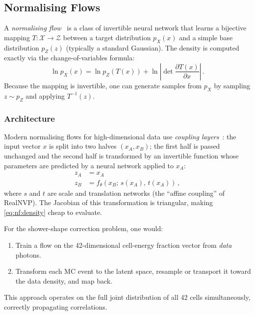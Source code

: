\documentclass[11pt,a4paper]{article}
\begin{document}
\subsection{Normalising Flows}
\label{sec:alternatives:nf}

A \emph{normalising flow}~\cite{Papamakarios:2021,NSF:2019,MAF:2017}
is a class of invertible neural network that learns a bijective
mapping $T: \mathcal{X} \to \mathcal{Z}$ between a target
distribution $p_X(x)$ and a simple base distribution
$p_Z(z)$ (typically a standard Gaussian).  The density is
computed exactly via the change-of-variables formula:
\begin{equation}
  \ln p_X(x) = \ln p_Z(T(x)) + \ln\left|
    \det \frac{\partial T(x)}{\partial x}\right|\,.
  \label{eq:nf:density}
\end{equation}
Because the mapping is invertible, one can generate samples from
$p_X$ by sampling $z \sim p_Z$ and applying $T^{-1}(z)$.

\subsubsection{Architecture}

Modern normalising flows for high-dimensional data use
\emph{coupling layers}~\cite{RealNVP:2017}: the input vector $x$ is
split into two halves $(x_A, x_B)$; the first half is passed
unchanged and the second half is transformed by an invertible
function whose parameters are predicted by a neural network
applied to $x_A$:
\begin{align}
  z_A &= x_A \\
  z_B &= f_\theta(x_B;\, s(x_A),\, t(x_A))\,,
  \label{eq:nf:coupling}
\end{align}
where $s$ and $t$ are scale and translation networks (the ``affine
coupling'' of RealNVP).  The Jacobian of this transformation is
triangular, making \cref{eq:nf:density} cheap to evaluate.

For the shower-shape correction problem, one would:
\begin{enumerate}[label=\arabic*.]
  \item Train a flow on the 42-dimensional cell-energy fraction
        vector from \emph{data} photons.
  \item Transform each MC event to the latent space, resample or
        transport it toward the data density, and map back.
\end{enumerate}
This approach operates on the full joint distribution of all 42 cells
simultaneously, correctly propagating correlations.
\end{document}
